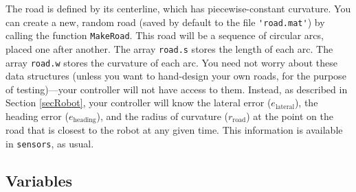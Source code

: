 \documentclass[12pt]{article}
\begin{document}
The road is defined by its centerline, which has piecewise-constant curvature. You can create a new, random road (saved by default to the file \lstinline|'road.mat'|) by calling the function \lstinline|MakeRoad|. This road will be a sequence of circular arcs, placed one after another. The array \lstinline|road.s| stores the length of each arc. The array \lstinline|road.w| stores the curvature of each arc. You need not worry about these data structures (unless you want to hand-design your own roads, for the purpose of testing)---your controller will not have access to them. Instead, as described in Section \ref{secRobot}, your controller will know the lateral error ($e_\text{lateral}$), the heading error ($e_\text{heading}$), and the radius of curvature ($r_\text{road}$) at the point on the road that is closest to the robot at any given time. This information is available in \lstinline|sensors|, as usual.

\subsection{Variables}
\end{document}
